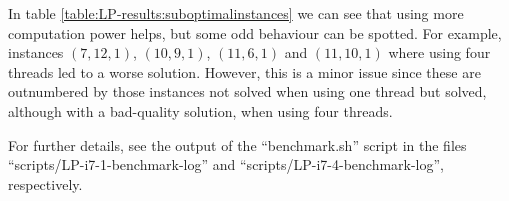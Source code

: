 In table \ref{table:LP-results:suboptimalinstances} we can see that using more
computation power helps, but some odd behaviour can be spotted. For example,
instances $(7,12,1)$, $(10,9,1)$, $(11,6,1)$ and $(11,10,1)$  where using four
threads led to a worse solution. However, this is a minor issue since these are
outnumbered by those instances not solved when using one thread but solved,
although with a bad-quality solution, when using four threads.

\hfill

For further details, see the output of the ``benchmark.sh'' script in the files
``scripts/LP-i7-1-benchmark-log'' and ``scripts/LP-i7-4-benchmark-log'', respectively.

